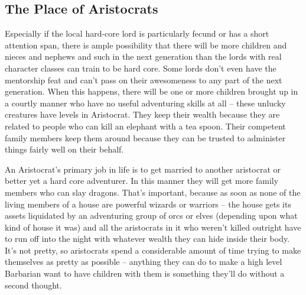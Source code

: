 \subsection{The Place of Aristocrats}

Especially if the local hard-core lord is particularly fecund or has a short attention span, there is ample possibility that there will be more children and nieces and nephews and such in the next generation than the lords with real character classes can train to be hard core. Some lords don't even have the mentorship feat and can't pass on their awesomeness to any part of the next generation. When this happens, there will be one or more children brought up in a courtly manner who have no useful adventuring skills at all -- these unlucky creatures have levels in Aristocrat. They keep their wealth because they are related to people who can kill an elephant with a tea spoon. Their competent family members keep them around because they can be trusted to administer things fairly well on their behalf.

An Aristocrat's primary job in life is to get married to another aristocrat or better yet a hard core adventurer. In this manner they will get more family members who can slay dragons. That's important, because as soon as none of the living members of a house are powerful wizards or warriors -- the house gets its assets liquidated by an adventuring group of orcs or elves (depending upon what kind of house it was) and all the aristocrats in it who weren't killed outright have to run off into the night with whatever wealth they can hide inside their body. It's not pretty, so aristocrats spend a considerable amount of time trying to make themselves as pretty as possible -- anything they can do to make a high level Barbarian want to have children with them is something they'll do without a second thought.

